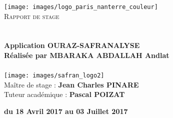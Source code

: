 \begin{titlepage}
\begin{center}

\texttt{[image: images/logo\_paris\_nanterre\_couleur]}~\\[1cm]

\textsc{\LARGE Rapport de stage  }\\[1.5cm]

\textsc{\Large }\\[0.5cm]

\HRule \\[0.4cm]

{\huge \bfseries Application OURAZ-SAFRANALYSE\\
Réalisée par MBARAKA ABDALLAH Andlat \\[0.4cm] }
\HRule \\[0.4cm]
\vfill
\texttt{[image: images/safran\_logo2]}~\\[1cm]

Maître de stage : \textbf{Jean Charles PINARE} \\
Tuteur académique : \textbf{Pascal POIZAT} \\
\vspace*{0.5cm}


{\large} \textbf{du 18 Avril 2017 au 03 Juillet 2017}

\end{center}
\end{titlepage}